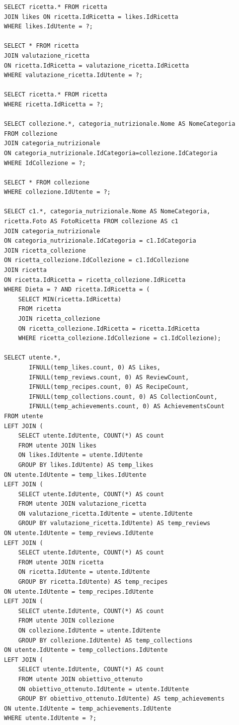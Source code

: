 ﻿\documentclass[a4paper,12pt]{report}
\begin{document}
\begin{verbatim}
SELECT ricetta.* FROM ricetta
JOIN likes ON ricetta.IdRicetta = likes.IdRicetta
WHERE likes.IdUtente = ?;

SELECT * FROM ricetta
JOIN valutazione_ricetta
ON ricetta.IdRicetta = valutazione_ricetta.IdRicetta
WHERE valutazione_ricetta.IdUtente = ?;

SELECT ricetta.* FROM ricetta
WHERE ricetta.IdRicetta = ?;

SELECT collezione.*, categoria_nutrizionale.Nome AS NomeCategoria
FROM collezione
JOIN categoria_nutrizionale
ON categoria_nutrizionale.IdCategoria=collezione.IdCategoria
WHERE IdCollezione = ?;

SELECT * FROM collezione
WHERE collezione.IdUtente = ?;

SELECT c1.*, categoria_nutrizionale.Nome AS NomeCategoria,
ricetta.Foto AS FotoRicetta FROM collezione AS c1
JOIN categoria_nutrizionale 
ON categoria_nutrizionale.IdCategoria = c1.IdCategoria
JOIN ricetta_collezione 
ON ricetta_collezione.IdCollezione = c1.IdCollezione
JOIN ricetta 
ON ricetta.IdRicetta = ricetta_collezione.IdRicetta
WHERE Dieta = ? AND ricetta.IdRicetta = (
    SELECT MIN(ricetta.IdRicetta)
    FROM ricetta
    JOIN ricetta_collezione
    ON ricetta_collezione.IdRicetta = ricetta.IdRicetta
    WHERE ricetta_collezione.IdCollezione = c1.IdCollezione);

SELECT utente.*,
       IFNULL(temp_likes.count, 0) AS Likes,
       IFNULL(temp_reviews.count, 0) AS ReviewCount,
       IFNULL(temp_recipes.count, 0) AS RecipeCount,
       IFNULL(temp_collections.count, 0) AS CollectionCount,
       IFNULL(temp_achievements.count, 0) AS AchievementsCount
FROM utente
LEFT JOIN (
    SELECT utente.IdUtente, COUNT(*) AS count
    FROM utente JOIN likes
    ON likes.IdUtente = utente.IdUtente
    GROUP BY likes.IdUtente) AS temp_likes
ON utente.IdUtente = temp_likes.IdUtente
LEFT JOIN (
    SELECT utente.IdUtente, COUNT(*) AS count
    FROM utente JOIN valutazione_ricetta
    ON valutazione_ricetta.IdUtente = utente.IdUtente
    GROUP BY valutazione_ricetta.IdUtente) AS temp_reviews
ON utente.IdUtente = temp_reviews.IdUtente
LEFT JOIN (
    SELECT utente.IdUtente, COUNT(*) AS count
    FROM utente JOIN ricetta
    ON ricetta.IdUtente = utente.IdUtente
    GROUP BY ricetta.IdUtente) AS temp_recipes
ON utente.IdUtente = temp_recipes.IdUtente
LEFT JOIN (
    SELECT utente.IdUtente, COUNT(*) AS count
    FROM utente JOIN collezione
    ON collezione.IdUtente = utente.IdUtente
    GROUP BY collezione.IdUtente) AS temp_collections
ON utente.IdUtente = temp_collections.IdUtente
LEFT JOIN (
    SELECT utente.IdUtente, COUNT(*) AS count
    FROM utente JOIN obiettivo_ottenuto
    ON obiettivo_ottenuto.IdUtente = utente.IdUtente
    GROUP BY obiettivo_ottenuto.IdUtente) AS temp_achievements
ON utente.IdUtente = temp_achievements.IdUtente
WHERE utente.IdUtente = ?;


\end{verbatim}
\end{document}
